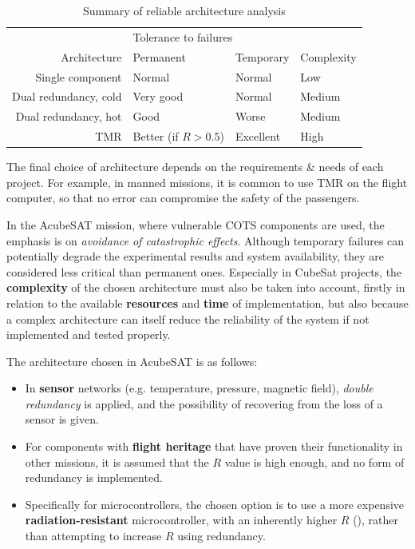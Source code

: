 \documentclass[a4paper,nobib]{tufte-book}
\begin{document}
\begin{table}[h]
	\caption{Summary of reliable architecture analysis}
	\label{tab:calcuresults}
	\begin{tabular}{@{}rlll@{}}
		\toprule
		& \multicolumn{2}{l}{Tolerance to failures} & \\ \cmidrule{2-3}
		Architecture & Permanent & Temporary & Complexity \\ \midrule
		Single component & \color{MaterialGrey800} Normal & \color{MaterialGrey800} Normal & \color{MaterialGreen600} Low \\
		Dual redundancy, cold & \color{MaterialGreenA700} Very good & \color{MaterialGrey800} Normal & \color{MaterialOrange900} Medium\\
		Dual redundancy, hot & \color{MaterialGreen600} Good & \color{MaterialOrange900} Worse & \color{MaterialOrange900} Medium\\
		\acl{TMR} & \color{MaterialTeal900} Better {\small(if \(R > 0.5\))} & \color{MaterialGreenA700} Excellent & \color{MaterialRed800} High \\ \bottomrule
	\end{tabular}
	\vspace{1ex}
\end{table}



The final choice of architecture depends on the requirements \& needs of each project. For example, in manned missions, it is common to use \acs{TMR} on the flight computer, so that no error can compromise the safety of the passengers.

In the AcubeSAT mission, where vulnerable \acs{COTS} components are used, the emphasis is on \emph{avoidance of catastrophic effects}. Although temporary failures can potentially degrade the experimental results and system availability, they are considered less critical than permanent ones. Especially in CubeSat projects, the \textbf{complexity} of the chosen architecture must also be taken into account, firstly in relation to the available \textbf{resources} and \textbf{time} of implementation, but also because a complex architecture can itself reduce the reliability of the system if not implemented and tested properly.

The architecture chosen in AcubeSAT is as follows:
\begin{itemize}
	\item In \textbf{sensor} networks (e.g. temperature, pressure, magnetic field), \emph{double redundancy} is applied, and the possibility of recovering from the loss of a sensor is given.
	\item For components with \textbf{flight heritage} that have proven their functionality in other missions, it is assumed that the \( R \) value is high enough, and no form of redundancy is implemented.
	\item Specifically for microcontrollers, the chosen option is to use a more expensive \textbf{radiation-resistant} microcontroller, with an inherently higher \( R \) (), rather than attempting to increase \( R \) using redundancy.
\end{itemize}
\end{document}
